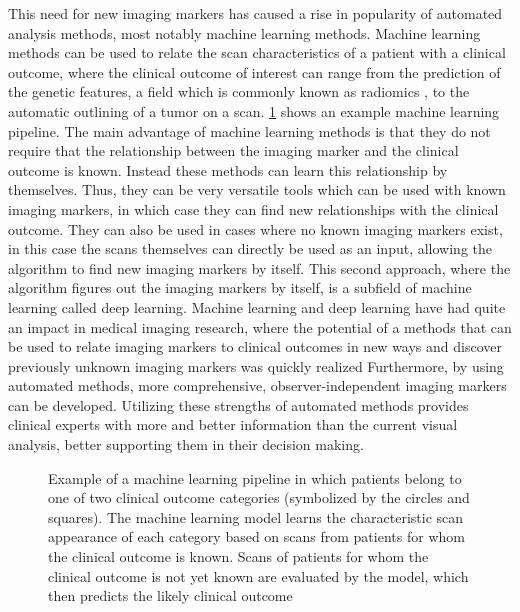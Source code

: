 This need for new imaging markers has caused a rise in popularity of automated analysis methods, most notably machine learning methods.
Machine learning methods can be used to relate the scan characteristics of a patient with a clinical outcome, where the clinical outcome of interest can range from the prediction of the genetic features, a field which is commonly known as radiomics \autocite{lambin2012radiomics}, to the automatic outlining of a \gls{tumor} on a scan.
\cref{fig:intro_example_ml} shows an example machine learning pipeline.
The main advantage of machine learning methods is that they do not require that the relationship between the imaging marker and the clinical outcome is known.
Instead these methods can learn this relationship by themselves.
Thus, they can be very versatile tools which can be used with known imaging markers, in which case they can find new relationships with the clinical outcome.
They can also be used in cases where no known imaging markers exist, in this case the scans themselves can directly be used as an input, allowing the algorithm to find new imaging markers by itself.
This second approach, where the algorithm figures out the imaging markers by itself, is a subfield of machine learning called deep learning.
Machine learning and deep learning have had quite an impact in medical imaging research, where the potential of a methods that can be used to relate imaging markers to clinical outcomes in new ways and discover previously unknown imaging markers was quickly realized \autocite{lee2017deep, gillies2016radiomics}
Furthermore, by using automated methods, more comprehensive, observer-independent imaging markers can be developed.
Utilizing these strengths of automated methods provides clinical experts with more and better information than the current visual analysis, better supporting them in their decision making.


\begin{figure}[htbp]
    \centering
    \caption{Example of a machine learning pipeline in which patients belong to one of two clinical outcome categories (symbolized by the circles and squares).
    The machine learning model learns the characteristic scan appearance of each category based on scans from patients for whom the clinical outcome is known.
    Scans of patients for whom the clinical outcome is not yet known are evaluated by the model, which then predicts the likely clinical outcome}\label{fig:intro_example_ml}
\end{figure}



